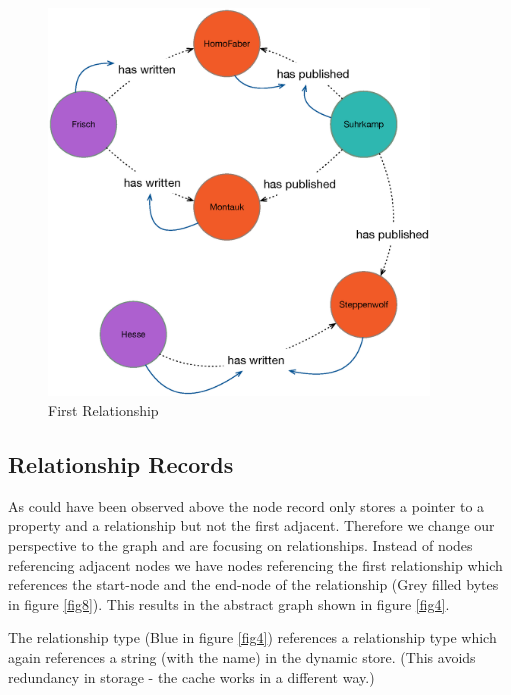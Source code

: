 \begin{figure}[h]
	\centering
 	 	\includegraphics[width=0.9\textwidth]{images/nextRelationship.eps}
	\caption{First Relationship}
	\label{fig3}
\end{figure}

\subsection{Relationship Records}
As could have been observed above the node record only stores a pointer to a property and a relationship but not the first adjacent. Therefore we change our perspective to the graph and are focusing on relationships.
Instead of nodes referencing adjacent nodes we have nodes referencing the first relationship which references the start-node and the end-node of the relationship (Grey filled bytes in figure \ref{fig8}). This results in the abstract graph shown in figure \ref{fig4}.

The relationship type (Blue in figure \ref{fig4}) references a relationship type which again references a string (with the name) in the dynamic store. (This avoids redundancy in storage - the cache works in a different way.) 

